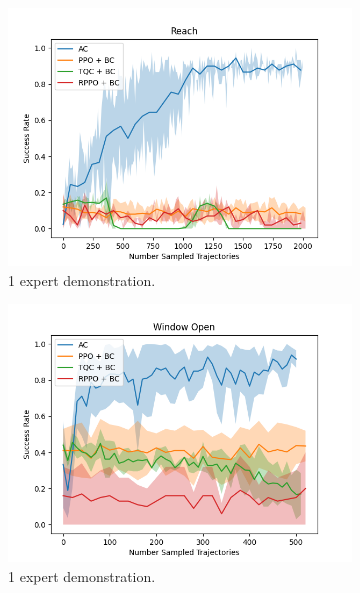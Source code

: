\begin{figure}[htbp]
    \centering
    \begin{subfigure}[t]{0.32\textwidth}
      \includegraphics[width=\textwidth]{images/1_2000/Reach.png}
      \caption{1 expert demonstration.}
    \end{subfigure}
    \begin{subfigure}[t]{0.32\textwidth}
      \includegraphics[width=\textwidth]{images/1_2000/Window Open.png}
      \caption{1 expert demonstration.}
    \end{subfigure}
    \begin{subfigure}[t]{0.32\textwidth}

\end{subfigure}
\end{figure}
